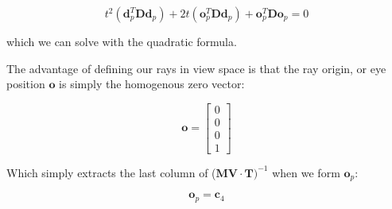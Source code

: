 \documentclass[11pt]{article}
\renewcommand{\v}[1]{\ensuremath{\mathbf{#1}}} %
\begin{document}
\begin{equation}
t^2(\v{d}^T_p\v{D}\v{d}_p) + 2t(\v{o}^T_p\v{D}\v{d}_p) + \v{o}^T_p\v{D}\v{o}_p = 0
\end{equation}

which we can solve with the quadratic formula.

The advantage of defining our rays in view space is that the ray origin, or eye position $\v{o}$ is simply the homogenous zero vector:

\begin{equation}
\v{o} = 
\begin{bmatrix}
0 \\
0 \\
0 \\
1
\end{bmatrix}
\end{equation}

Which simply extracts the last column of ($\v{MV}\cdot\v{T})^{-1}$ when we form $\v{o}_p$:

\begin{equation}
\v{o}_p = \v{c}_4
\end{equation}




\end{document}
